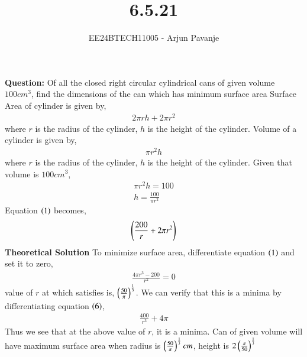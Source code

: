 \documentclass[journal]{IEEEtran}
\begin{document}

\vspace{3cm}

\title{6.5.21}
\author{EE24BTECH11005 - Arjun Pavanje}
{\let\newpage\relax\maketitle}
\textbf{Question:}
Of all the closed right circular cylindrical cans of given volume  $100 cm^3$, find the dimensions of the can which has minimum surface area \newline
\solution \newline
Surface Area of cylinder is given by, 
\begin{align}
  2\pi rh + 2\pi r^2
\end{align}
where $r$ is the radius of the cylinder, $h$ is the height of the cylinder.\newline
Volume of a cylinder is given by, 
\begin{align}
  \pi r^2 h
\end{align}
where $r$ is the radius of the cylinder, $h$ is the height of the cylinder.\newline
Given that volume is $100 cm^3$,
\begin{align}
  \pi r^2 h = 100\\
  h = \frac{100}{\pi r^2}
\end{align}
Equation $\left(1\right)$ becomes,
\begin{align}
  \left(\frac{200}{r} + 2\pi r^2\right)
\end{align}
\textbf{Theoretical Solution}\newline
To minimize surface area, differentiate equation $\left(1\right)$ and set it to zero,
\begin{align}
  \frac{4\pi r^3 - 200}{r^2}=0
\end{align}
value of $r$ at which satisfies is, $\left(\frac{50}{\pi}\right)^{\frac{1}{3}}$. We can verify that this is a minima by differentiating equation $\left(6\right)$,
\begin{align}
  \frac{400}{r^3} + 4\pi
\end{align}
Thus we see that at the above value of $r$, it is a minima.\newline
Can of given volume will have maximum surface area when radius is $\left(\frac{50}{\pi}\right)^{\frac{1}{3}} cm$, height is $2\left(\frac{\pi}{50}\right)^{\frac{1}{3}}$\newline
\end{document}
